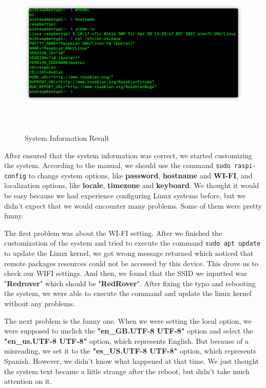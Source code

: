 \documentclass[12pt]{report}
\newcommand{\code}[1]{\colorbox{light-gray}{\texttt{#1}}}
\begin{document}
\begin{figure}[H]
    \includegraphics[width=\textwidth, height = 8cm]{img/Figure2.png}
    \centering
    \caption{System Information Result}
    \label{fig:fig2}
\end{figure}
After ensured that the system information was correct, we started customizing the system. According to the manual, we should use the command \code{sudo raspi-config} to change system options, like \textbf{password}, \textbf{hostname} and \textbf{WI-FI},  and localization options, like \textbf{locale}, \textbf{timezone} and \textbf{keyboard}. We thought it would be easy because we had experience configuring Linux systems before, but we didn't expect that we would encounter many problems. Some of them were pretty funny.\par
The first problem was about the WI-FI setting. After we finished the customization of the system and tried to execute the command \code{sudo apt update} to update the Linux kernel, we got wrong message returned which noticed that remote packages resources could not be accessed by this device. This drove us to check our WIFI settings. And then, we found that the SSID we inputted was "\textbf{Redrover}" which should be "\textbf{RedRover}". After fixing the typo and rebooting the system, we were able to execute the command and update the linux kernel without any problems.\par
The next problem is the funny one. When we were setting the local option, we were supposed to unclick the \textbf{"en\_GB.UTF-8 UTF-8"} option and select the \textbf{"en\_us.UTF-8 UTF-8"} option, which represents English. But because of a misreading, we set it to the \textbf{"es\_US.UTF-8 UTF-8"} option, which represents Spanish. However, we didn't know what happened at that time. We just thought the system text became a liitle strange after the reboot, but didn't take much attention on it.\par
\end{document}

